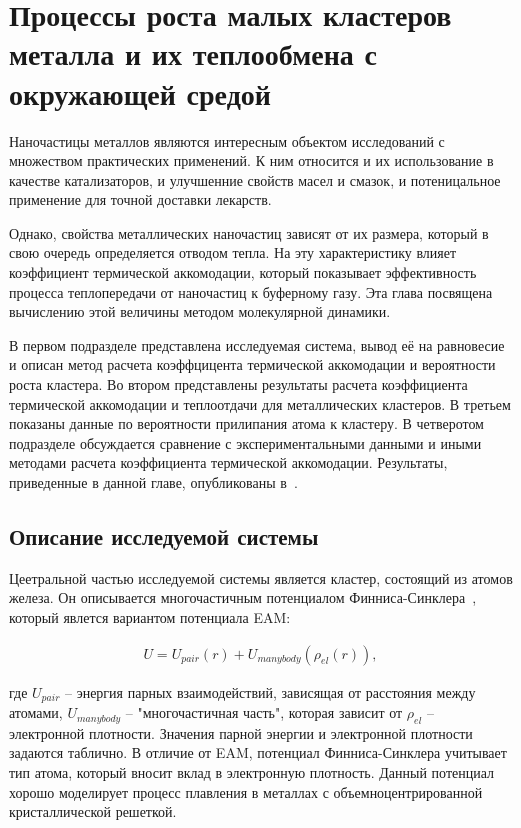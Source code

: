 \chapter{Процессы роста малых кластеров металла и их теплообмена с окружающей средой}\label{ch:ch6}

Наночастицы металлов являются интересным объектом исследований с множеством практических применений. К ним относится и их использование в качестве катализаторов, и улучшенние свойств масел и смазок, и потеницальное применение для точной доставки лекарств.

Однако, свойства металлических наночастиц зависят от их размера, который в свою очередь определяется отводом тепла. На эту характеристику влияет коэффициент термической аккомодации, который показывает эффективность процесса теплопередачи от наночастиц к буферному газу. Эта глава посвящена вычислению этой величины методом молекулярной динамики.

В первом подразделе представлена исследуемая система, вывод её на равновесие и описан метод расчета коэффцицента термической аккомодации и вероятности роста кластера. Во втором представлены результаты расчета коэффициента термической аккомодации и теплоотдачи для металлических кластеров. В третьем показаны данные по вероятности прилипания атома к кластеру. В четверотом подразделе обсуждается сравнение с экспериментальными данными и иными методами расчета коэффициента термической аккомодации. Результаты, приведенные в данной главе, опубликованы в~\cite{__2019, lenev_thermal_2016, lenev_sticking_2018}.

\section{Описание исследуемой системы}

Цеетральной частью исследуемой системы является кластер, состоящий из атомов железа. Он описывается многочастичным потенциалом Финниса-Синклера~\cite{mendelev_development_2003}, который явлется вариантом потенциала EAM:

\begin{align}
	U = U_{pair}(r) + U_{manybody}(\rho_{el}(r)),
\end{align}

где $U_{pair}$ \--- энергия парных взаимодействий, зависящая от расстояния между атомами, $U_{manybody}$ \--- "многочастичная часть", которая зависит от $\rho_{el}$ \--- электронной плотности. Значения парной энергии и электронной плотности задаются таблично. В отличие от EAM, потенциал Финниса-Синклера учитывает тип атома, который вносит вклад в электронную плотность. Данный потенциал хорошо моделирует процесс плавления в металлах с объемноцентрированной кристаллической решеткой. 

